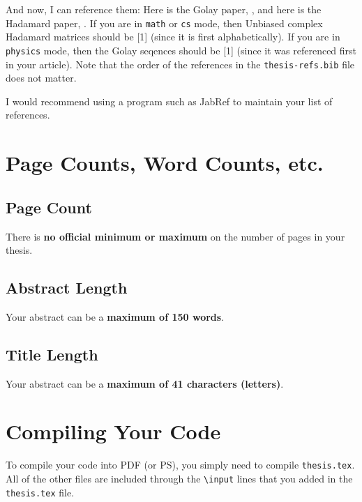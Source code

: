 And now, I can reference them: Here is the Golay paper, \cite{golay}, and here is the Hadamard paper, \cite{hadamard}. If you are in \texttt{math} or \texttt{cs} mode, then Unbiased complex Hadamard matrices should be [1] (since it is first alphabetically). If you are in \texttt{physics} mode, then the Golay seqences should be [1] (since it was referenced first in your article). Note that the order of the references in the \texttt{thesis-refs.bib} file does not matter.

I would recommend using a program such as JabRef to maintain your list of references.

\section[Page Counts, Word Counts, etc.]{Page Counts, Word Counts, etc.}
\label{sec:word_count}

\subsection[Page Count]{Page Count}
\label{subsec:page}

There is {\bf no official minimum or maximum} on the number of pages in your thesis.

\subsection[Abstract Length]{Abstract Length}
\label{subsec:abstract}

Your abstract can be a {\bf maximum of 150 words}.

\subsection[Title Length]{Title Length}
\label{subsec:title}

Your abstract can be a {\bf maximum of 41 characters (letters)}.

\section[Compiling Your Code]{Compiling Your Code}
\label{sec:compiling}

To compile your code into PDF (or PS), you simply need to compile \texttt{thesis.tex}. All of the other files are included through the \texttt{\textbackslash input} lines that you added in the \texttt{thesis.tex} file.

